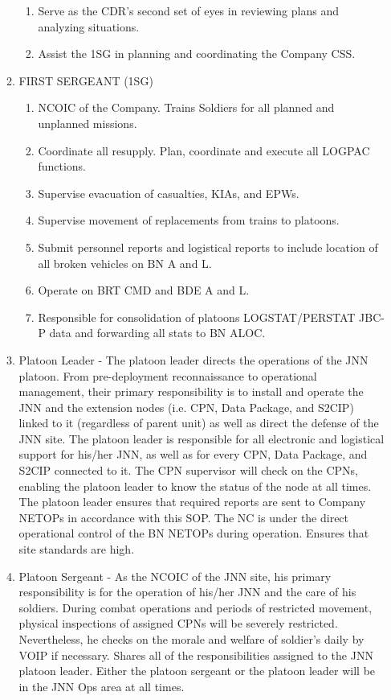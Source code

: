\documentclass{article}
\begin{document}
\begin{enumerate}
\begin{enumerate}
\begin{enumerate}
\item Serve as the CDR’s second set of eyes in reviewing plans and analyzing situations.
\item Assist the 1SG in planning and coordinating the Company CSS.
\end{enumerate}
\item FIRST SERGEANT (1SG)
\begin{enumerate}
\item NCOIC of the Company. Trains Soldiers for all planned and unplanned missions.
\item Coordinate all resupply.  Plan, coordinate and execute all LOGPAC functions.
\item Supervise evacuation of casualties, KIAs, and EPWs.
\item Supervise movement of replacements from trains to platoons.
\item Submit personnel reports and logistical reports to include location of all broken vehicles on BN A and L.
\item Operate on BRT CMD and BDE A and L.
\item Responsible for consolidation of platoons LOGSTAT/PERSTAT JBC-P data and forwarding all stats to BN ALOC.
\end{enumerate}
\item Platoon Leader - The platoon leader directs the operations of the JNN platoon.  From pre-deployment reconnaissance to operational management, their primary responsibility is to install and operate the JNN and the extension nodes (i.e. CPN, Data Package, and S2CIP) linked to it (regardless of parent unit) as well as direct the defense of the JNN site. The platoon leader is responsible for all electronic and logistical support for his/her JNN, as well as for every CPN, Data Package, and S2CIP connected to it. The CPN supervisor will check on the CPNs, enabling the platoon leader to know the status of the node at all times.  The platoon leader ensures that required reports are sent to Company NETOPs in accordance with this SOP.  The NC is under the direct operational control of the BN NETOPs during operation.  Ensures that site standards are high.
\item Platoon Sergeant - As the NCOIC of the JNN site, his primary responsibility is for the operation of his/her JNN and the care of his soldiers.  During combat operations and periods of restricted movement, physical inspections of assigned CPNs will be severely restricted. Nevertheless, he checks on the morale and welfare of soldier’s daily by VOIP if necessary. Shares all of the responsibilities assigned to the JNN platoon leader. Either the platoon sergeant or the platoon leader will be in the JNN Ops area at all times.

\end{enumerate}
\end{enumerate}
\end{document}

